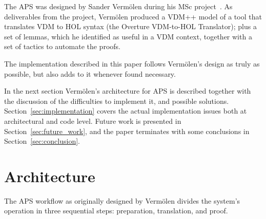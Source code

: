 \documentclass[]{article}
\begin{document}
The APS was designed by Sander Verm\"olen during his MSc project~\cite{Sander}.
As deliverables from the project, Verm\"olen produced a VDM++ model of a tool that translates VDM to HOL syntax (the Overture VDM-to-HOL Translator); plus a set of lemmas, which he identified as useful in a VDM context, together with a set of tactics to automate the proofs.

The implementation described in this paper follows Verm\"olen's design as truly as possible, but also adds to it whenever found necessary.

In the next section Verm\"olen's architecture for APS is described together with the discussion of the difficulties to implement it, and possible solutions.
Section~\ref{sec:implementation} covers the actual implementation issues both at architectural and code level.
Future work is presented in Section~\ref{sec:future_work}, and the paper terminates with some conclusions in Section~\ref{sec:conclusion}.




\section{Architecture}
\label{sec:intended_architecure}

%
%

The APS workflow as originally designed by Verm\"olen divides the system's operation in three sequential steps: preparation, translation, and proof.
\end{document}
